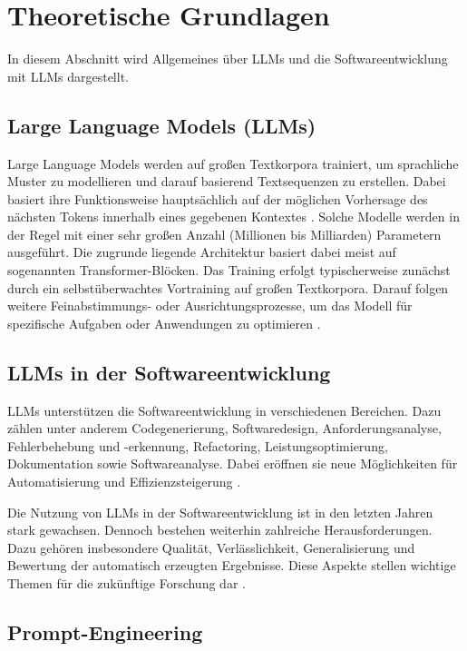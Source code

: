 
\chapter{Theoretische Grundlagen}
\label{chapter-basics}

In diesem Abschnitt wird Allgemeines über LLMs und die Softwareentwicklung mit LLMs dargestellt.
\section{Large Language Models (LLMs)}

Large Language Models werden auf großen Textkorpora trainiert, um sprachliche Muster zu modellieren und darauf basierend Textsequenzen zu erstellen. Dabei basiert ihre Funktionsweise hauptsächlich auf der
möglichen Vorhersage des nächsten Tokens innerhalb eines gegebenen Kontextes \cite{seemann2023ki}. Solche Modelle werden in der Regel mit einer sehr großen Anzahl (Millionen bis Milliarden) Parametern ausgeführt. Die zugrunde liegende Architektur basiert dabei meist auf sogenannten Transformer-Blöcken. Das Training erfolgt typischerweise zunächst durch ein selbstüberwachtes Vortraining auf großen Textkorpora.
Darauf folgen weitere Feinabstimmungs- oder Ausrichtungsprozesse, um das Modell für spezifische Aufgaben oder Anwendungen zu optimieren \cite{zhang2023survey}.

\section{LLMs in der Softwareentwicklung}

LLMs unterstützen die Softwareentwicklung in verschiedenen Bereichen. Dazu zählen unter anderem Codegenerierung, Softwaredesign, Anforderungsanalyse,
Fehlerbehebung und -erkennung, Refactoring, Leistungsoptimierung, Dokumentation sowie Softwareanalyse.
Dabei eröffnen sie neue Möglichkeiten für Automatisierung und Effizienzsteigerung \cite{LLMinSEreviewandvision}.

Die Nutzung von LLMs in der Softwareentwicklung ist in
den letzten Jahren stark gewachsen. Dennoch bestehen weiterhin zahlreiche Herausforderungen. Dazu gehören insbesondere Qualität, Verlässlichkeit, Generalisierung und Bewertung der automatisch erzeugten Ergebnisse.
Diese Aspekte stellen wichtige Themen für die zukünftige Forschung dar \cite{LLMinSEreviewandvision}.

\section{Prompt-Engineering}


